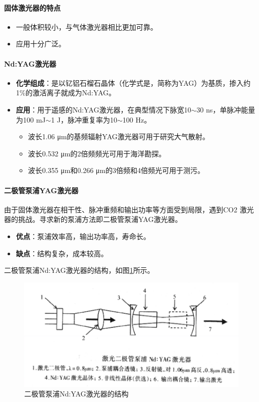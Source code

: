 \paragraph{固体激光器的特点}\begin{itemize}
	\item 一般体积较小，与气体激光器相比更加可靠。
	\item 应用十分广泛。
\end{itemize}

\paragraph{Nd:YAG激光器} \begin{itemize}
	\item \textbf{化学组成}：是以钇铝石榴石晶体（化学式是，简称为YAG）为基质，掺入约1\%的激活离子就成为Nd:YAG。
	\item \textbf{应用}：用于遥感的Nd:YAG激光器，在典型情况下脉宽10$ \sim $30 ns，单脉冲能量为100 mJ$ \sim $1 J，脉冲重复率为10$ \sim $100 Hz。
		\begin{itemize}
			\item 波长1.06 μm的基频辐射YAG激光器可用于研究大气散射。
			\item 波长0.532 μm的2倍频频光可用于海洋勘探。
			\item 波长0.355 μm和0.266 μm的3倍频和4倍频光可用于测污。
		\end{itemize}
\end{itemize}

\paragraph{二极管泵浦YAG激光器}由于固体激光器在相干性、脉冲重频和输出功率等方面受到局限，遇到CO2 激光器的挑战。寻求新的泵浦方法即二极管泵浦YAG激光器。
\begin{itemize}
	\item \textbf{优点}：泵浦效率高，输出功率高，寿命长。
	\item \textbf{缺点}：结构复杂，成本较高。
\end{itemize}
二极管泵浦Nd:YAG激光器的结构，如图\ref{fig:激光二极管泵浦YAG激光器}所示。
\begin{figure}[htbp]
	\centering
	\includegraphics[width=0.7\linewidth]{figure/Chapter2/激光二极管泵浦YAG激光器}
	\caption{二极管泵浦Nd:YAG激光器的结构}
	\label{fig:激光二极管泵浦YAG激光器}
\end{figure}

